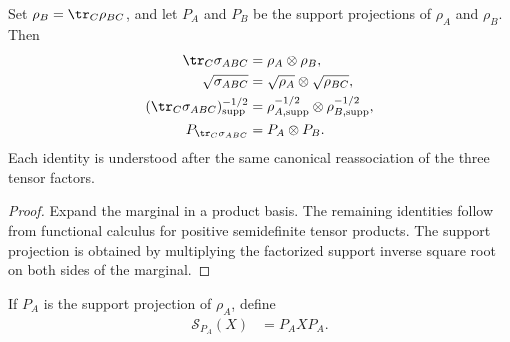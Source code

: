 \begin{theorem}
    \label{thm:entropy_product_reference_support_calculus}
    \leanok
    Set $\rho_B=\tr_C\rho_{BC}$, and let $P_A$ and $P_B$ be the support
    projections of $\rho_A$ and $\rho_B$. Then
    \begin{align}
        \tr_C\sigma_{ABC}
        &=\rho_A\otimes\rho_B,
        \label{eq:entropy_product_reference_marginal}\\
        \sqrt{\sigma_{ABC}}
        &=\sqrt{\rho_A}\otimes\sqrt{\rho_{BC}},
        \notag\\
        (\tr_C\sigma_{ABC})^{-1/2}_{\mathrm{supp}}
        &=\rho_{A,\mathrm{supp}}^{-1/2}\otimes
          \rho_{B,\mathrm{supp}}^{-1/2},
        \notag\\
        P_{\tr_C\sigma_{ABC}}
        &=P_A\otimes P_B.
        \label{eq:entropy_product_reference_support}
    \end{align}
    Each identity is understood after the same canonical reassociation of the
    three tensor factors.
\end{theorem}

\begin{proof}\leanok
    Expand the marginal in a product basis. The remaining identities follow
    from functional calculus for positive semidefinite tensor products. The
    support projection is obtained by multiplying the factorized support
    inverse square root on both sides of the marginal.
\end{proof}

\begin{definition}
    \label{def:entropy_support_compression}
    \leanok
    If $P_A$ is the support projection of $\rho_A$, define
    \begin{align}
        \mathcal S_{P_A}(X)
        &=P_AXP_A.
        \label{eq:entropy_support_compression}
    \end{align}
\end{definition}


